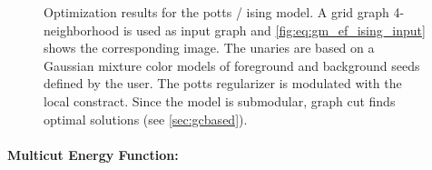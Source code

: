 \begin{figure}[H]
    \centering
    \caption[Potts Model]{ \label{fig:gm_ef_ising}
        Optimization results for the potts / ising model.
        A grid graph 4-neighborhood is used as input graph and 
        \cref{fig:eq:gm_ef_ising_input} shows the corresponding image.
        The unaries are based on a Gaussian mixture color models of foreground and background seeds defined by the user.
        The potts regularizer is modulated with the local constract.
        Since the model is submodular, graph cut finds optimal solutions (see \cref{sec:gcbased}).
    }
\end{figure}





\paragraph{Multicut Energy Function:}


